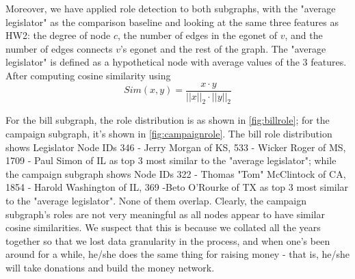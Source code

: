 \documentclass[12pt,twocolumn]{article}
\begin{document}
Moreover, we have applied role detection to both subgraphs, with the "average legislator" as the comparison baseline and looking at the same three features as HW2: the degree of node $c$, the number of edges in the egonet of $v$, and the number of edges connects $v$'s egonet and the rest of the graph. The "average legislator" is defined as a hypothetical node with average values of the 3 features. After computing cosine similarity using $$Sim(x,y) = \frac{x\cdot{y}}{||x||_2 \cdot{||y||_2}}$$

For the bill subgraph, the role distribution is as shown in \ref{fig:billrole}; for the campaign subgraph, it's shown in \ref{fig:campaignrole}. The bill role distribution shows Legislator Node IDs {346 - Jerry Morgan of KS, 533 - Wicker Roger of MS, 1709 - Paul Simon of IL} as top 3 most similar to the "average legislator"; while the campaign subgraph shows Node IDs {322 - Thomas "Tom" McClintock of CA, 1854 - Harold Washington of IL, 369 -Beto O'Rourke of TX} as top 3 most similar to the "average legislator". None of them overlap. Clearly, the campaign subgraph's roles are not very meaningful as all nodes appear to have similar cosine similarities. We suspect that this is because we collated all the years together so that we lost data granularity in the process, and when one's been around for a while, he/she does the same thing for raising money - that is, he/she will take donations and build the money network. 
\end{document}

